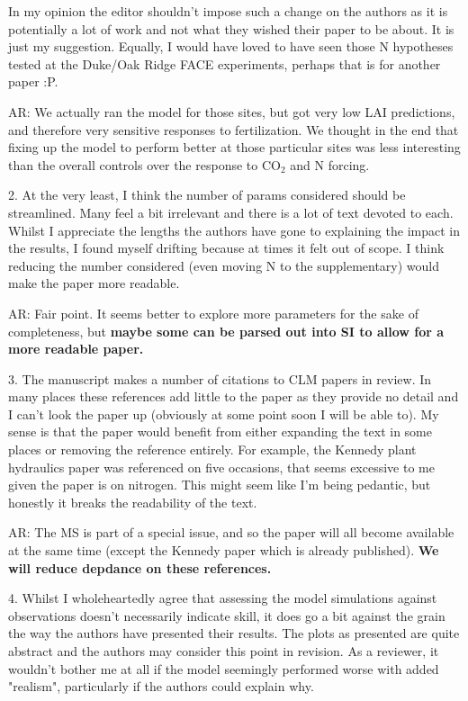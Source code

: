 \documentclass{article}
\begin{document}
In my opinion the editor shouldn't impose such a change on the authors as it is potentially a lot of work and not what they wished their paper to be about. It is just my suggestion. Equally, I would have loved to have seen those N hypotheses tested at the Duke/Oak Ridge FACE experiments, perhaps that is for another paper :P.

\textsf{AR: We actually ran the model for those sites, but got very low LAI predictions, and therefore very sensitive responses to fertilization. We thought in the end that fixing up the model to perform better at those particular sites was less interesting than the overall controls over the response to CO$_{2}$ and N forcing.}

2. At the very least, I think the number of params considered should be streamlined. Many feel a bit irrelevant and there is a lot of text devoted to each. Whilst I appreciate the lengths the authors have gone to explaining the impact in the results, I found myself drifting because at times it felt out of scope. I think reducing the number considered (even moving N to the supplementary) would make the paper more readable. 

\textsf{AR: Fair point. It seems better to explore more parameters for the sake of completeness, but \textbf{maybe some can be parsed out into SI to allow for a more readable paper.} }

3. The manuscript makes a number of citations to CLM papers in review. In many places these references add little to the paper as they provide no detail and I can't look the paper up (obviously at some point soon I will be able to). My sense is that the paper would benefit from either expanding the text in some places or removing the reference entirely. For example, the Kennedy plant hydraulics paper was referenced on five occasions, that seems excessive to me given the paper is on nitrogen. This might seem like I'm being pedantic, but honestly it breaks the readability of the text. 

\textsf{AR: The MS is part of a special issue, and so the paper will all become available at the same time (except the Kennedy paper which is already published). \textbf{We will reduce depdance on these references.} }

4. Whilst I wholeheartedly agree that assessing the model simulations against observations doesn't necessarily indicate skill, it does go a bit against the grain the way the authors have presented their results. The plots as presented are quite abstract and the authors may consider this point in revision. As a reviewer, it wouldn't bother me at all if the model seemingly performed worse with added "realism", particularly if the authors could explain why. 
\end{document}
